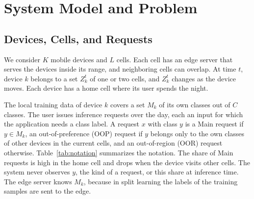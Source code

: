 \section{System Model and Problem}
\label{sec:system}

\subsection{Devices, Cells, and Requests}

We consider $K$ mobile devices and $L$ cells. Each cell has an edge server that serves the devices inside its range, and neighboring cells can overlap. At time $t$, device $k$ belongs to a set $Z_k^t$ of one or two cells, and $Z_k^t$ changes as the device moves. Each device has a home cell where its user spends the night.

The local training data of device $k$ covers a set $M_k$ of its own classes out of $C$ classes. The user issues inference requests over the day, each an input for which the application needs a class label. A request $x$ with class $y$ is a Main request if $y\in M_k$, an out-of-preference (OOP) request if $y$ belongs only to the own classes of other devices in the current cells, and an out-of-region (OOR) request otherwise. Table~\ref{tab:notation} summarizes the notation. The share of Main requests is high in the home cell and drops when the device visits other cells. The system never observes $y$, the kind of a request, or this share at inference time. The edge server knows $M_k$, because in split learning the labels of the training samples are sent to the edge.

